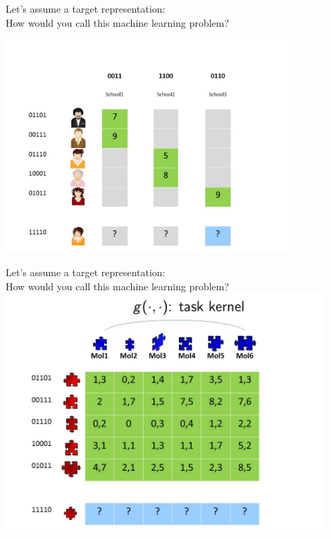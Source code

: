 \documentclass[]{beamer}
\begin{document}
\begin{frame}{Let's assume a target representation: \\
How would you call this machine learning problem?}
\begin{center}
\includegraphics[width=0.8\textwidth,trim = 0 0 100 30,clip]{Figures/pictures/Slide6}
\end{center}

\end{frame}

\begin{frame}{Let's assume a target representation: \\
How would you call this machine learning problem?}
\vspace{0.8cm}
\includegraphics[width=0.9\textwidth,trim = 0 0 0 90,clip]{Figures/pictures/Slide4}

\end{frame}
\end{document}
